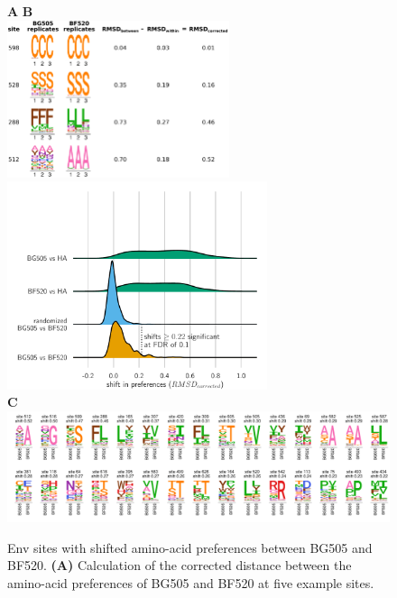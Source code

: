 \documentclass[9pt]{elife}
\begin{document}
\begin{figure}
\begin{fullwidth}
{\bf \Large A} \hspace{0.61\textwidth} {\bf \Large B} \\
\hspace{0.01\textwidth} 
\includegraphics[width=0.58\textwidth]{figures/prefs_distance/prefs_distance.pdf}
\hspace{0.03\textwidth}
\includegraphics[clip=true, trim=0in 0in 0in 1.2in, width=0.68\textwidth]{figures/distance_distribution.pdf}
\vspace{0.15in}
\\ 
{\bf \Large C} \\
\includegraphics[width=1.3\textwidth]{figures/shifted_sites.pdf}
\caption{\label{fig:prefsdist}
Env sites with shifted amino-acid preferences between BG505 and BF520.
{\bf (A)} Calculation of the corrected distance between the amino-acid preferences of BG505 and BF520 at five example sites.
}
\end{fullwidth}
\end{figure}
\end{document}
